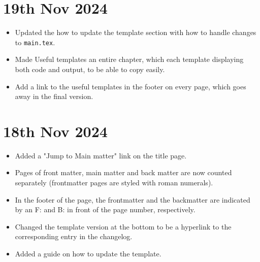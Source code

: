 \section*{19th Nov 2024} \label{sec:changelog:2024/11/19}
\begin{itemize}
    \item Updated the how to update the template section with how to handle changes to \verb|main.tex|.
    \item Made Useful templates an entire chapter, which each template displaying both code and output, to be able to copy easily.
    \item Add a link to the useful templates in the footer on every page, which goes away in the final version.
\end{itemize}

\section*{18th Nov 2024} \label{sec:changelog:2024/11/18}
\begin{itemize}
    \item Added a "Jump to Main matter" link on the title page.
    \item Pages of front matter, main matter and back matter are now counted separately (frontmatter pages are styled with roman numerals).
    \item In the footer of the page, the frontmatter and the backmatter are indicated by an F: and B: in front of the page number, respectively.
    \item Changed the template version at the bottom to be a hyperlink to the corresponding entry in the changelog.
    \item Added a guide on how to update the template.
\end{itemize}